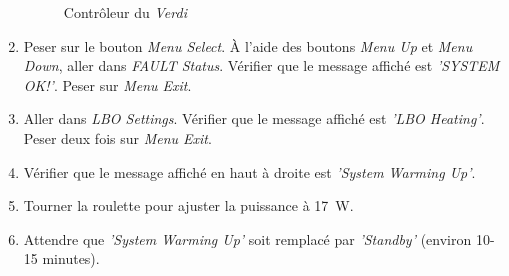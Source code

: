 \begin{enumerate}
\begin{figure}[H]
        \caption{Contrôleur du \textit{Verdi}}
        \label{fig:controleur-verdi}
        \end{figure}
    \item Peser sur le bouton \textit{Menu Select}. À l'aide des boutons \textit{Menu Up} et \textit{Menu Down}, aller dans \textit{FAULT Status}. Vérifier que le message affiché est \textit{'SYSTEM OK!'}. Peser sur \textit{Menu Exit}.
    \item Aller dans \textit{LBO Settings}. Vérifier que le message affiché est \textit{'LBO Heating'}. Peser deux fois sur \textit{Menu Exit}.
    \item Vérifier que le message affiché en haut à droite est \textit{'System Warming Up'}.
    \item Tourner la roulette pour ajuster la puissance à 17~W.
    \item Attendre que \textit{'System Warming Up'} soit remplacé par \textit{'Standby'} (environ 10-15 minutes).
\end{enumerate}